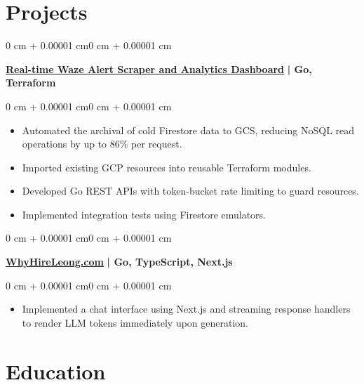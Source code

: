 \documentclass[10pt, letterpaper]{article}
\newenvironment{highlights}{
    \begin{itemize}[
        topsep=0.10 cm,
        parsep=0.10 cm,
        partopsep=0pt,
        itemsep=0pt,
        leftmargin=0 cm + 10pt
    ]
}{
    \end{itemize}
}
\newenvironment{onecolentry}{
    \begin{adjustwidth}{0 cm + 0.00001 cm}{0 cm + 0.00001 cm}
}{
    \end{adjustwidth}
}
\begin{document}
\section{Projects}
\vspace{0.1cm}

\begin{onecolentry}
    \href{https://github.com/Lllllllleong/wazePoliceScraperGCP}{\textbf{Real-time Waze Alert Scraper and Analytics Dashboard}}\textbf{ | Go, Terraform}
\end{onecolentry}


\vspace{0.1cm}

\begin{onecolentry}
    \begin{highlights}
        \item Automated the archival of cold Firestore data to GCS, reducing NoSQL read operations by up to 86\% per request.
        \item Imported existing GCP resources into reusable Terraform modules.
        \item Developed Go REST APIs with token-bucket rate limiting to guard resources.
        \item Implemented integration tests using Firestore emulators.

    \end{highlights}
\end{onecolentry}

\vspace{0.2cm}

\begin{onecolentry}
    \href{https://www.whyhireleong.com/}{\textbf{WhyHireLeong.com}}\textbf{ | Go, TypeScript, Next.js}
\end{onecolentry}

\vspace{0.1cm}

\begin{onecolentry}
    \begin{highlights}
        \item Implemented a chat interface using Next.js and streaming response handlers to render LLM tokens immediately upon generation.
    \end{highlights}
\end{onecolentry}

\section{Education}
\vspace{0.1cm}
\end{document}
